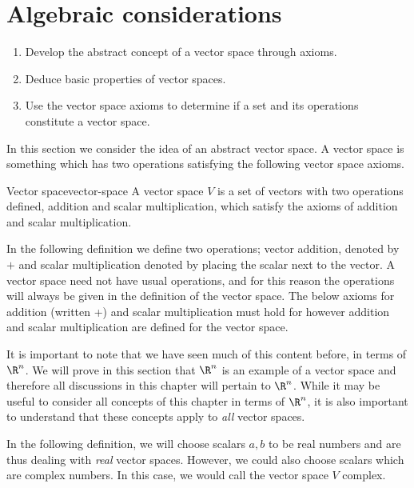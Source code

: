 \section{Algebraic considerations}

\begin{outcome}
  \begin{enumerate}
  \item Develop the abstract concept of a vector space through axioms.
  \item Deduce basic properties of vector spaces.
  \item Use the vector space axioms to determine if a set and its
    operations constitute a vector space.
  \end{enumerate}
\end{outcome}

In this section we consider the idea of an abstract vector space. A vector space is
something which has two operations satisfying the following vector space
axioms.

\begin{definition}{Vector space}{vector-space}
A vector space $V$ is a set of vectors with two operations defined, addition and scalar multiplication, which satisfy the axioms of addition and scalar multiplication. 
\end{definition}

In the following definition we define two operations; vector addition, denoted by $+$ and scalar
multiplication denoted by placing the scalar next to the vector. A vector space need not have usual operations, and for this reason the operations will always be given in the definition of the vector space. The below axioms for addition (written +) and scalar multiplication must hold for however addition and scalar multiplication are defined for the vector space.  

It is important to note that we have seen much of this content before, in terms of $\R^n$. We will prove in this section that $\R^n$ is an example of a vector space and therefore all discussions in this chapter will pertain to $\R^n$. While it may be useful to consider all concepts of this chapter in terms of $\R^n$, it is also important to understand that these concepts apply to \textit{all} vector spaces. 

In the following definition, we will choose scalars $a,b$ to be real numbers and are thus dealing with \textit{real} vector spaces. However, we could also choose scalars which are complex numbers. In this case, we would call the vector space $V$ complex. 

